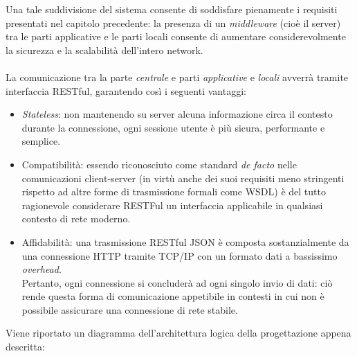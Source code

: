 \documentclass[12pt]{article}
\begin{document}
Una tale suddivisione del sistema consente di soddisfare pienamente i requisiti presentati nel capitolo precedente: la presenza di un \textit{middleware} (cioè il server)  tra le parti applicative e le parti locali consente di aumentare considerevolmente la sicurezza e la scalabilità dell'intero network.\\\\
La comunicazione tra la parte \textit{centrale} e parti \textit{applicative} e \textit{locali} avverrà tramite interfaccia RESTful, garantendo così i seguenti vantaggi:
\begin{itemize}
	\item \textit{Stateless}: non mantenendo su server alcuna informazione circa il contesto durante la connessione, ogni sessione utente è più sicura, performante e semplice.
	\item Compatibilità: essendo riconosciuto come standard \textit{de facto} nelle comunicazioni client-server (in virtù anche dei suoi requisiti meno stringenti rispetto ad altre forme di trasmissione formali come WSDL) è del tutto ragionevole considerare RESTFul un interfaccia applicabile in qualsiasi contesto di rete moderno.
	\item Affidabilità: una trasmissione RESTful JSON è composta sostanzialmente da una connessione HTTP tramite TCP/IP con un formato dati a bassissimo \textit{overhead}.\\
	Pertanto, ogni connessione si concluderà ad ogni singolo invio di dati:  ciò rende questa forma di comunicazione appetibile in contesti in cui non è possibile assicurare una connessione di rete stabile.
\end{itemize}
Viene riportato un diagramma dell'architettura logica della progettazione appena descritta:
\end{document}

